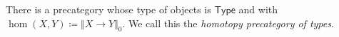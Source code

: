 \documentclass{mscs}
\makeatletter
\newcommand{\defeq}{\coloneqq}  %
\def\prd#1{{\textstyle\prod}(#1)\@ifnextchar\bgroup{\;\prd}{,}}
\def\sm#1{{\textstyle\sum}(#1)\@ifnextchar\bgroup{\;\prd}{,}}
\newcommand{\type}{\ensuremath{\mathsf{Type}}\xspace}
\newcommand{\prop}{\ensuremath{\mathsf{Prop}}\xspace}
\newcommand{\trunc}[2]{\Vert #2\Vert_{#1}}
\newcommand{\Trunc}[2]{\Big\Vert #2\Big\Vert_{#1}}
\def\pizero{\trunc0}
\newcommand{\Brck}[1]{\Trunc{}{#1}}
\newcommand{\urel}{\ensuremath{\underline{\mathsf{Rel}}}\xspace}
\numberwithin{equation}{section}
\makeatother
\begin{document}
\begin{eg}\label{ct:hoprecat}
  There is a precategory whose type of objects is \type and with $\hom(X,Y) \defeq \pizero{X\to Y}$.
  We call this the \emph{homotopy precategory of types}.
\end{eg}

\end{document}
